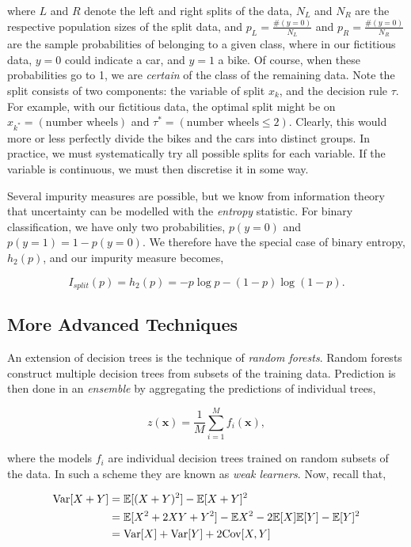 \documentclass[11pt]{amsart}
\begin{document}
where $L$ and $R$ denote the left and right splits of the data, $N_L$ and $N_R$ are the respective population sizes of the split data, and $p_L = \frac{\#(y = 0)}{N_L}$ and $p_R = \frac{\#(y = 0)}{N_R}$ are the sample probabilities of belonging to a given class, where in our fictitious data, $y=0$ could indicate a car, and $y=1$ a bike. Of course, when these probabilities go to 1, we are \emph{certain} of the class of the remaining data. Note the split consists of two components: the variable of split $x_k$, and the decision rule $\tau$. For example, with our fictitious data, the optimal split might be on $x_{k^*} = (\text{number wheels})$ and $\tau^* = (\text{number wheels} \leq 2)$. Clearly, this would more or less perfectly divide the bikes and the cars into distinct groups. In practice, we must systematically try all possible splits for each variable. If the variable is continuous, we must then discretise it in some way.

Several impurity measures are possible, but we know from information theory that uncertainty can be modelled with the \emph{entropy} statistic. For binary classification, we have only two probabilities, $p(y = 0)$ and $p(y=1) = 1 - p(y=0)$. We therefore have the special case of binary entropy, $h_2(p)$, and our impurity measure becomes,

$$I_{split}(p) = h_2(p) = -p\log p - (1-p)\log (1-p).$$

\subsection{More Advanced Techniques}

An extension of decision trees is the technique of \emph{random forests}. Random forests construct multiple decision trees from subsets of the training data. Prediction is then done in an \emph{ensemble} by aggregating the predictions of individual trees,

$$z(\mathbf{x}) = \frac{1}{M}\sum_{i=1}^M f_i(\mathbf{x}),$$

where the models $f_i$ are individual decision trees trained on random subsets of the data. In such a scheme they are known as \emph{weak learners}. Now, recall that,

\begin{align}
\text{Var}[X + Y] &= \mathbb{E}[(X + Y)^2] - \mathbb{E}[X + Y]^2 \notag \\
&= \mathbb{E}[X^2 + 2XY + Y^2] - \mathbb{E}{X}^2 - 2\mathbb{E}[X]\mathbb{E}[Y] - \mathbb{E}[Y]^2 \notag \\
&= \text{Var}[X] + \text{Var}[Y] + 2\text{Cov}[X, Y] \notag
\end{align}
\end{document}
